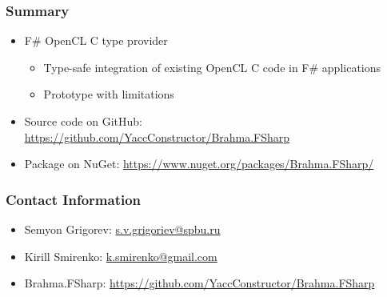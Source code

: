\documentclass[xcolor=table]{beamer}
\begin{document}
            
\begin{frame}
  \transwipe[direction=90]
  \frametitle{Summary}         
\begin{itemize}
\item F\# OpenCL C type provider
\begin {itemize}
\item Type-safe integration of existing OpenCL C code in F\# applications
\item Prototype with limitations
\end{itemize}
\vspace{1cm}
\item Source code on GitHub: \url{https://github.com/YaccConstructor/Brahma.FSharp}
\item Package on NuGet: \url{https://www.nuget.org/packages/Brahma.FSharp/}
\end{itemize}
\end{frame}           
            
\begin{frame}
\transwipe[direction=90]
\frametitle{Contact Information}
\begin{itemize}
  \item Semyon Grigorev: \href{mailto:s.v.grigoriev@spbu.ru}{s.v.grigoriev@spbu.ru}
  \item Kirill Smirenko: \href{mailto:k.smirenko@gmail.com}{k.smirenko@gmail.com}
\end{itemize}
\begin{itemize}
  \item Brahma.FSharp: \href{https://github.com/YaccConstructor/Brahma.FSharp}{https://github.com/YaccConstructor/Brahma.FSharp}
\end{itemize}
\hspace{2cm}
\end{frame}
\end{document}
